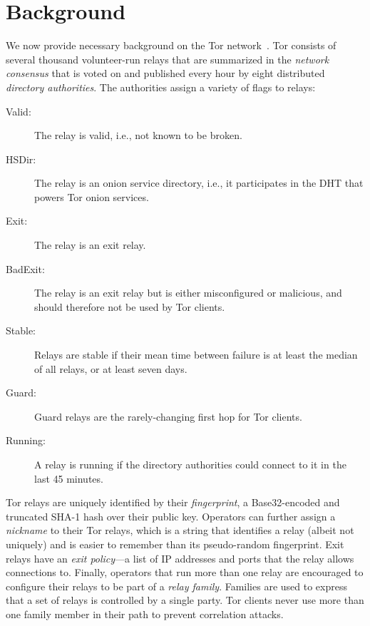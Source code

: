 \section{Background}
\label{sec:background}
We now provide necessary background on the Tor network~\cite{Dingledine2004a}.
Tor consists of several thousand volunteer-run relays that are summarized in the
\emph{network consensus} that is voted on and published every hour by eight
distributed \emph{directory authorities}.  The authorities assign a variety of
flags to relays:

\begin{description}
	\item[Valid:] The relay is valid, i.e., not known to be broken.
	\item[HSDir:] The relay is an onion service directory, i.e., it participates
		in the DHT that powers Tor onion services.
	\item[Exit:] The relay is an exit relay.
	\item[BadExit:] The relay is an exit relay but is either misconfigured or
		malicious, and should therefore not be used by Tor clients.
	\item[Stable:] Relays are stable if their mean time between failure is at
		least the median of all relays, or at least seven days.
	\item[Guard:] Guard relays are the rarely-changing first hop for Tor clients.
	\item[Running:] A relay is running if the directory authorities could
		connect to it in the last 45 minutes.
\end{description}

Tor relays are uniquely identified by their \emph{fingerprint}, a Base32-encoded
and truncated SHA-1 hash over their public key.  Operators can further assign a
\emph{nickname} to their Tor relays, which is a string that identifies a relay
(albeit not uniquely) and is easier to remember than its pseudo-random
fingerprint.  Exit relays have an \emph{exit policy}---a list of IP addresses
and ports that the relay allows connections to.  Finally, operators that run
more than one relay are encouraged to configure their relays to be part of a
\emph{relay family}.  Families are used to express that a set of relays is
controlled by a single party.  Tor clients never use more than one family member
in their path to prevent correlation attacks.
